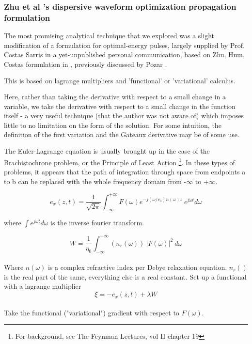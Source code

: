 \documentclass[paper.tex]{subfiles}
\begin{document}

\subsubsection{Zhu et al 's dispersive waveform optimization propagation formulation}

The most promising analytical technique that we explored was a slight modification of a formulation for optimal-energy pulses, largely supplied by Prof. Costas Sarris in a yet-unpublished personal communication, based on Zhu, Hum, Costas formulation in \cite{Microwave2012b}, previously discussed by Pozar \cite{Waveform2003}. 

This is based on lagrange multipliers and 'functional' or 'variational' calculus\cite{Methods1989}. 

Here, rather than taking the derivative with respect to a small change in a variable, we take the derivative with respect to a small change in the function itself - a very useful technique (that the author was not aware of) which imposes little to no limitation on the form of the solution. For some intuition, the definition of the first variation and the Gateaux derivative may be of some use.

The Euler-Lagrange equation is usually brought up in the case of the Brachistochrone problem, or 
the Principle of Least Action \footnote{For background, see The Feynman Lectures, vol II chapter 19}. In these types of problems, it appears that the path of integration through space from endpoints a to b can be replaced with the whole frequency domain from -$\infty$ to +$\infty$. 

$$ e_x(z,t) = \frac{1}{\sqrt{2 \pi}} \int_{-\infty}^{+\infty}{F(\omega) e^{- j (\omega/c_0)n(\omega)z}\ e^{j\omega t} d\omega} $$

where $\int e^{j \omega t} d\omega$ is the inverse fourier transform.

$$W = \frac{1}{\eta_0} \int_{-\infty}^{+\infty}{(n_r(\omega))\ |F(\omega)|^2}\ d\omega$$\\

Where $n(\omega)$ is a complex refractive index per Debye relaxation equation, $n_r()$ is the real part of the same, everything else is a real constant. Set up a functional with a lagrange multiplier\\

$$\xi = -e_x(z,t) + \lambda W$$\\

Take the functional ("variational") gradient with respect to $F(\omega)$.
\end{document}
